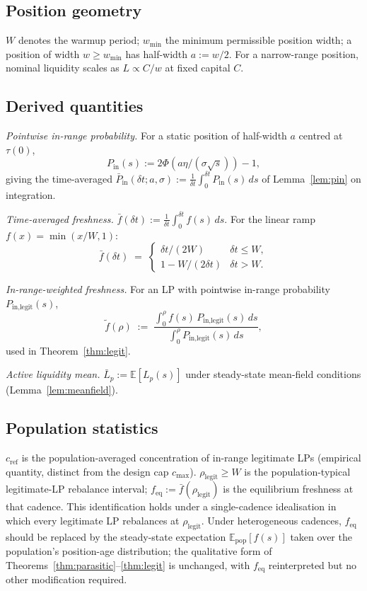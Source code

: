 \documentclass[11pt,a4paper]{article}
\theoremstyle{definition}
\theoremstyle{plain}
\theoremstyle{remark}
\begin{document}
\subsection*{Position geometry}

$W$ denotes the warmup period; $w_{\min}$ the minimum permissible position width; a position of width $w \geq w_{\min}$ has half-width $a := w/2$. For a narrow-range position, nominal liquidity scales as $L \propto C/w$ at fixed capital $C$.

\subsection*{Derived quantities}

\noindent\emph{Pointwise in-range probability.} For a static position of half-width $a$ centred at $\tau(0)$,
\[
P_{\text{in}}(s) := 2\Phi(a\eta/(\sigma\sqrt{s})) - 1,
\]
giving the time-averaged $\bar P_{\text{in}}(\delta t; a, \sigma) := \frac{1}{\delta t} \int_0^{\delta t} P_{\text{in}}(s)\,ds$ of Lemma~\ref{lem:pin} on integration.

\noindent\emph{Time-averaged freshness.} $\bar f(\delta t) := \frac{1}{\delta t}\int_0^{\delta t} f(s)\,ds$. For the linear ramp $f(x) = \min(x/W, 1)$:
\begin{equation}\label{eq:fbar}
\bar f(\delta t) \;=\; \begin{cases} \delta t/(2W) & \delta t \leq W, \\ 1 - W/(2\delta t) & \delta t > W. \end{cases}
\end{equation}

\noindent\emph{In-range-weighted freshness.} For an LP with pointwise in-range probability $P_{\text{in,legit}}(s)$,
\begin{equation}\label{eq:tildef}
\tilde f(\rho) \;:=\; \frac{\int_0^\rho f(s)\,P_{\text{in,legit}}(s)\,ds}{\int_0^\rho P_{\text{in,legit}}(s)\,ds},
\end{equation}
used in Theorem~\ref{thm:legit}.

\noindent\emph{Active liquidity mean.} $\bar L_p := \mathbb{E}[L_p(s)]$ under steady-state mean-field conditions (Lemma~\ref{lem:meanfield}).

\subsection*{Population statistics}

$c_{\text{ref}}$ is the population-averaged concentration of in-range legitimate LPs (empirical quantity, distinct from the design cap $c_{\max}$). $\rho_{\text{legit}} \geq W$ is the population-typical legitimate-LP rebalance interval; $f_{\text{eq}} := \bar f(\rho_{\text{legit}})$ is the equilibrium freshness at that cadence. This identification holds under a single-cadence idealisation in which every legitimate LP rebalances at $\rho_{\text{legit}}$. Under heterogeneous cadences, $f_{\text{eq}}$ should be replaced by the steady-state expectation $\mathbb{E}_{\text{pop}}[f(s)]$ taken over the population's position-age distribution; the qualitative form of Theorems~\ref{thm:parasitic}--\ref{thm:legit} is unchanged, with $f_{\text{eq}}$ reinterpreted but no other modification required.
\end{document}
